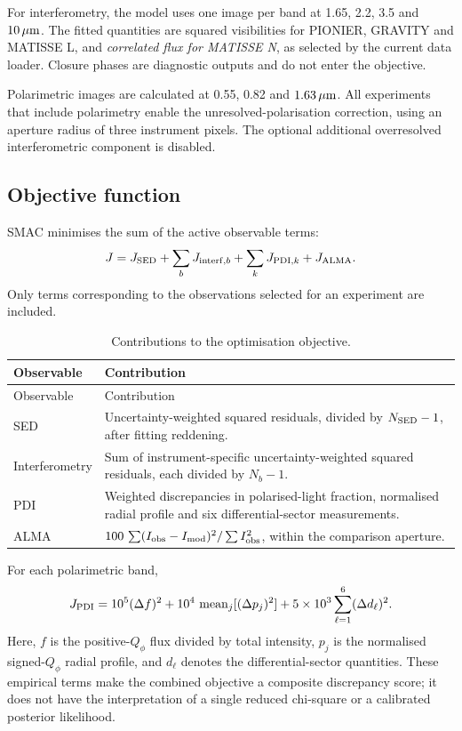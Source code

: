 \documentclass[11pt,a4paper]{article}
\begin{document}
For interferometry, the model uses one image per band at 1.65, 2.2, 3.5
and $10\,\mu{\rm m}$. The fitted quantities are squared visibilities for
PIONIER, GRAVITY and MATISSE L, and \emph{correlated flux for MATISSE N},
as selected by the current data loader. Closure phases are diagnostic
outputs and do not enter the objective.

Polarimetric images are calculated at 0.55, 0.82 and
$1.63\,\mu{\rm m}$. All experiments that include polarimetry enable the
unresolved-polarisation correction, using an aperture radius of three
instrument pixels. The optional additional overresolved interferometric
component is disabled.

\subsection{Objective function}

SMAC minimises the sum of the active observable terms:
\begin{equation}
J=J_{\rm SED}
+\sum_b J_{{\rm interf},b}
+\sum_k J_{{\rm PDI},k}
+J_{\rm ALMA}.
\label{eq:objective}
\end{equation}
Only terms corresponding to the observations selected for an experiment
are included.

\begin{longtable}{@{}P{3.0cm}P{13.2cm}@{}}
\caption{Contributions to the optimisation objective.}
\label{tab:objective}\\
\toprule
Observable & Contribution \\
\midrule
\endfirsthead
\toprule
Observable & Contribution \\
\midrule
\endhead
\bottomrule
\endfoot
SED & Uncertainty-weighted squared residuals, divided by $N_{\rm SED}-1$, after fitting reddening. \\
Interferometry & Sum of instrument-specific uncertainty-weighted squared residuals, each divided by $N_b-1$. \\
PDI & Weighted discrepancies in polarised-light fraction, normalised radial profile and six differential-sector measurements. \\
ALMA & $100\,\sum(I_{\rm obs}-I_{\rm mod})^2/\sum I_{\rm obs}^2$, within the comparison aperture. \\
\end{longtable}

For each polarimetric band,
\begin{equation}
J_{\rm PDI}
=10^5(\Delta f)^2
+10^4\,\operatorname{mean}_j[(\Delta p_j)^2]
+5\times10^3\sum_{\ell=1}^{6}(\Delta d_\ell)^2.
\end{equation}
Here, $f$ is the positive-$Q_\phi$ flux divided by total intensity,
$p_j$ is the normalised signed-$Q_\phi$ radial profile, and $d_\ell$
denotes the differential-sector quantities. These empirical terms make
the combined objective a composite discrepancy score; it does not have
the interpretation of a single reduced chi-square or a calibrated
posterior likelihood.
\end{document}
